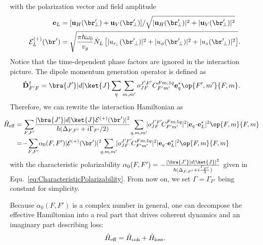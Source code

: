 \documentclass[]{report}
\begin{document}
with the polarization vector and field amplitude 
\begin{align}
\mathbf{e}_L &= [\mathbf{u}_H(\br'\!\!_\perp)+\mathbf{u}_V(\br'\!\!_\perp)]/\sqrt{|\mathbf{u}_H(\br'\!\!_\perp)|^2+|\mathbf{u}_V(\br'\!\!_\perp)|^2} \\
\mathcal{E}_L^{(+)} (\br') &= \sqrt{\frac{{\pi}\hbar\omega_0}{v_g}\dot{N}_L \left[ |u_{r\!_\perp}(\br'\!_\perp)|^2 + |u_\phi(\br'\!_\perp)|^2 +|u_z(\br'\!_\perp)|^2 \right]}.
\end{align}
Notice that the time-dependent phase factors are ignored in the interaction picture. 
The dipole momentum generation operator is defined as
\begin{align}
\hat{\mathbf{D}}_{F'F}^{\dagger} &= \bra{J'}| d |\ket{J}\sum_{q}\sum_{m,m'} o^{J'F'}_{JF} C^{F m;1q}_{F' m'} \mathbf{e}_q^* \op{F',m'}{F,m}.
\end{align}
Therefore, we can rewrite the interaction Hamiltonian as
\begin{align}
\!\!\!\!\!\!\hat{H}_{\rm eff} &= \sum_{F,F'} \! \frac{ |\bra{J'}| d |\ket{J} \mathcal{E}^{(+)}(\br')|^2}{\hbar(\Delta_{F,F'}+i\Gamma_{F'}/2)}\! \sum_{q,m,m'}\!\! |o^{J'F'}_{JF}\! C^{F m;1q}_{F' m'} |^2 |\mathbf{e}_q\!\cdot\! \mathbf{e}_L^*|^2\op{F,m}{F,m} \\
&= \!-\! \sum_{F,F'} \! \alpha_0(F,F')|\mathcal{E}^{(+)}(\br')|^2\!\! \sum_{q,m,m'}\!\! |o^{J'F'}_{JF}\! C^{F m;1q}_{F' m'} |^2 |\mathbf{e}_q\!\cdot\! \mathbf{e}_L^*|^2\op{F,m}{F,m}
\end{align}
with the characteristic polarizability $ \alpha_0(F,F')=- \frac{ |\bra{J'}| d |\ket{J}|^2 }{\hbar (\Delta_{F,F'}+i\frac{\Gamma_{F'}}{2})} $ given in Equ.~\eqref{eq:CharacteristicPolarizability}. From now on, we set $ \Gamma=\Gamma_{F'} $ being constant for simplicity. 

Because $\alpha_0(F,F')$ is a complex number in general, one can decompose the effective Hamiltonian into a real part that drives coherent dynamics and an imaginary part describing loss:
\begin{align}
	\hat{H}_{\rm eff} = \hat{H}_{\rm coh} + \hat{H}_{\rm loss}.
\end{align}
\end{document}
